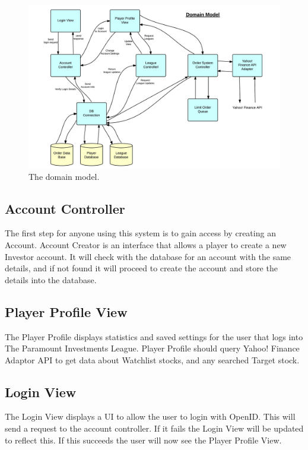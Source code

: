 \begin{figure}[H]
\centering
\includegraphics[width=5.5in]{./img/domModel.jpg}
\caption{The domain model.}
\end{figure}

\subsection{Account Controller}
The first step for anyone using this system is to gain access by creating an Account.
Account Creator is an interface that allows a player to create a new Investor account.
It will check with the database for an account with the same details, and if not found
it will proceed to create the account and store the details into the database.\\

\subsection{Player Profile View}
The Player Profile displays statistics and saved settings for the user that logs
into The Paramount Investments League. Player Profile should query Yahoo! Finance
Adaptor API to get data about Watchlist stocks, and any searched Target stock.\\

\subsection{Login View}
The Login View displays a UI to allow the user to login with OpenID. This will send
a request to the account controller. If it fails the Login View will be updated to
reflect this. If this succeeds the user will now see the Player Profile View.\\

